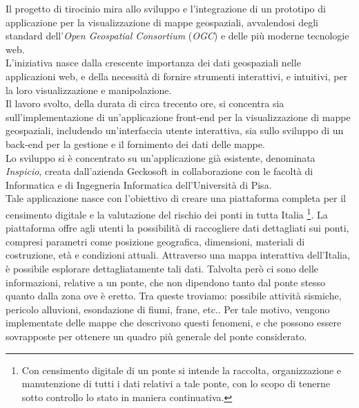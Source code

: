 Il progetto di tirocinio mira allo sviluppo e l'integrazione di un prototipo di applicazione per la visualizzazione di mappe geospaziali,
avvalendosi degli standard dell'\textit{Open Geospatial Consortium} (\textit{OGC}) e delle più moderne tecnologie web.
\\L'iniziativa nasce dalla crescente importanza dei dati geospaziali nelle applicazioni web, e della necessità di fornire strumenti interattivi, e intuitivi, per la loro visualizzazione e manipolazione.
\\Il lavoro svolto, della durata di circa trecento ore, si concentra sia sull'implementazione di un'applicazione front-end per la visualizzazione di mappe geospaziali, includendo un'interfaccia utente
interattiva, sia sullo sviluppo di un back-end per la gestione e il fornimento dei dati delle mappe.
\\Lo sviluppo si è concentrato su un'applicazione già esistente, denominata \textit{Inspicio}, creata dall'azienda Geckosoft in collaborazione con le facoltà di Informatica e di Ingegneria Informatica dell'Università di Pisa.
\\Tale applicazione nasce con l'obiettivo di creare una piattaforma completa per il censimento digitale e la valutazione del rischio dei ponti in tutta Italia
\footnote[1]{Con censimento digitale di un ponte si intende la raccolta, organizzazione e manutenzione di tutti i dati relativi a tale ponte, con lo scopo di tenerne sotto controllo lo stato in maniera continuativa.}.
La piattaforma offre agli utenti la possibilità di raccogliere dati dettagliati sui ponti, compresi parametri come posizione geografica, dimensioni, materiali di costruzione, età e condizioni attuali.
Attraverso una mappa interattiva dell'Italia, è possibile esplorare dettagliatamente tali dati.
Talvolta però ci sono delle informazioni, relative a un ponte, che non dipendono tanto dal ponte stesso quanto dalla zona ove è eretto. Tra queste troviamo: possibile attività sismiche, pericolo alluvioni, esondazione di fiumi, frane, etc.. Per tale motivo, vengono implementate delle mappe che descrivono questi fenomeni, e che possono essere sovrapposte per ottenere un quadro più generale del ponte considerato.



